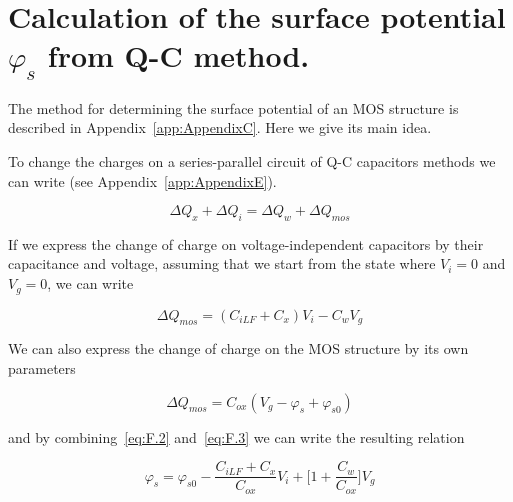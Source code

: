 
\chapter{Calculation of the surface potential $\varphi_s$ from Q-C method.}\label{app:AppendixF}

The method for determining the surface potential of an MOS structure
is described in Appendix~\ref{app:AppendixC}. Here we give its main idea.

To change the charges on a series-parallel circuit of Q-C capacitors
methods we can write (see Appendix~\ref{app:AppendixE}).

\begin{equation}\label{eq:F.1}
  \Delta Q_x + \Delta Q_i = \Delta Q_w + \Delta Q_{mos}
\end{equation}

If we express the change of charge on voltage-independent capacitors
by their capacitance and voltage, assuming that we start from the
state where $V_i=0$ and $V_g=0$, we can write

\begin{equation}\label{eq:F.2}
  \Delta Q_{mos} = (C_{iLF} + C_{x})V_{i} - C_{w}V_{g}
\end{equation}

We can also express the change of charge on the MOS structure by its
own parameters

\begin{equation}\label{eq:F.3}
  \Delta Q_{mos} = C_{ox}(V_{g} - \varphi_{s} + \varphi_{s0})
\end{equation}

and by combining~\ref{eq:F.2} and~\ref{eq:F.3} we can write the
resulting relation

\begin{equation}\label{eq:F.4}
  \varphi_{s} = \varphi_{s0} - \frac{C_{iLF} + C_{x}}{C_{ox}}V_i + {\bigg[1 + \frac{C_{w}}{C_{ox}}\bigg]}V_{g}
\end{equation}
